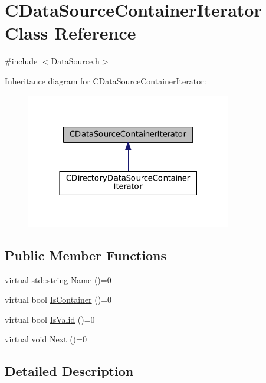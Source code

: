 \hypertarget{classCDataSourceContainerIterator}{}\section{C\+Data\+Source\+Container\+Iterator Class Reference}
\label{classCDataSourceContainerIterator}


{\ttfamily \#include $<$Data\+Source.\+h$>$}



Inheritance diagram for C\+Data\+Source\+Container\+Iterator\+:
\nopagebreak
\begin{figure}[H]
\begin{center}
\leavevmode
\includegraphics[width=254pt]{classCDataSourceContainerIterator__inherit__graph}
\end{center}
\end{figure}
\subsection*{Public Member Functions}
\begin{DoxyCompactItemize}
\item 
virtual std\+::string \hyperlink{classCDataSourceContainerIterator_a95b57204a76fab1d5a75a01189d5fcc5}{Name} ()=0
\item 
virtual bool \hyperlink{classCDataSourceContainerIterator_aafcccb5733f936b03e1930b09c02df87}{Is\+Container} ()=0
\item 
virtual bool \hyperlink{classCDataSourceContainerIterator_ad1e2a9c6bde2f80ed03cb45085ce0441}{Is\+Valid} ()=0
\item 
virtual void \hyperlink{classCDataSourceContainerIterator_a2a9cc99d17cd217727ac4ab5e78f1a35}{Next} ()=0
\end{DoxyCompactItemize}


\subsection{Detailed Description}


